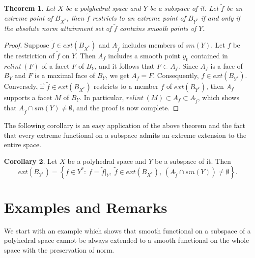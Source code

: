 \documentclass{amsart}
\newtheorem{theorem}{Theorem}[section]
\theoremstyle{definition}
\newtheorem{corollary}[theorem]{Corollary}
\theoremstyle{remark}
\numberwithin{equation}{section}
\begin{document}
\begin{theorem}\label{Restr. extr.}
Let $X$ be a polyhedral space and $Y$ be a subspace of it. Let $\widetilde{f}$ be an extreme point of $B_{X^*}$, then $\widetilde{f}$ restricts to an extreme point of $B_{Y^*}$ if and only if the absolute norm attainment set of $\widetilde{f}$ contains smooth points of $Y$.
\end{theorem}

\begin{proof}
Suppose $\widetilde{f}\in ext(B_{X^*})$ and $A_{\widetilde{f}}$ includes members of $sm(Y)$. Let $f$ be the restriction of $\widetilde{f}$ on $Y$. Then $A_f$ includes a smooth point $y_0$ contained in $relint~(F)$ of a facet $F$ of $B_Y$, and it follows that $F\subset A_f$. Since $A_f$ is a face of $B_Y$ and $F$ is a maximal face of $B_Y$, we get $A_f=F$. Consequently, $f\in ext(B_{Y^*})$. Conversely, if $\widetilde{f}\in ext(B_{X^*})$ restricts to a member $f$ of $ext(B_{Y^*})$, then $A_f$ supports a facet $M$ of $B_Y$. In particular, $relint~(M)\subset A_f \subset A_{\widetilde{f}}$, which shows that $A_{\widetilde{f}}\cap sm(Y)\neq \emptyset$, and the proof is now complete.
\end{proof}
\noindent The following corollary is an easy application of the above theorem and the fact that every extreme functional on a subspace admits an extreme extension to the entire space.
\begin{corollary}
Let $X$ be a polyhedral space and $Y$ be a subspace of it. Then\[ext(B_{Y^*})=\left\{f\in Y^*:~f=\widetilde{f}\lvert_{Y},~\widetilde{f}\in ext(B_{X^*}),~(A_{\widetilde{f}}\cap sm(Y))\neq \emptyset\right\}.\]
\end{corollary}


\section{Examples and Remarks}

\noindent We start with an example which shows that smooth functional on a subspace of a polyhedral space cannot be always extended to a smooth functional on the whole space with the preservation of norm.
\end{document}
